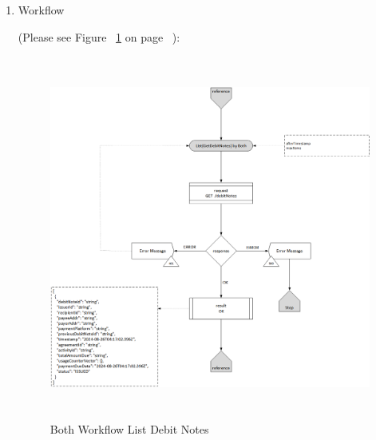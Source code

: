 \begin{enumerate}
\begin{table}[H]
\begin{center}
\begin{tabular}{|p{3cm}|l|p{3cm}|p{3cm}|p{4cm}|}
\end{tabular}
\end{center}
\end{table}

\item Workflow

(Please see Figure ~\ref{fig:BLDN} on page ~\pageref{fig:BLDN}):

\begin{figure}[htbp]
    \centering
    \includegraphics[width=12cm,height=12cm,angle=0]{./diag/Workflow/Payment/List(GetDebitNotes)-B-Workflow.png}
    \caption{Both Workflow List Debit Notes }
	\label{fig:BLDN}
\end{figure}


\end{enumerate}

\newpage



